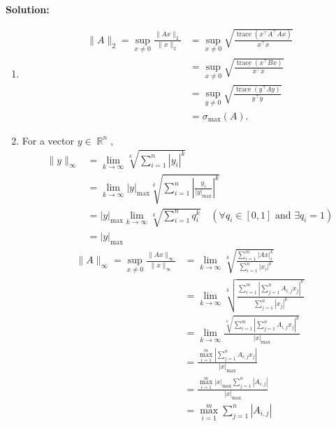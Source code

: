 \documentclass{article}
\DeclareMathOperator{\trac}{\mathrm{trace}}
\DeclareMathOperator{\R}{\mathbb{R}}
\newenvironment{solution}{\color{blue} \smallskip \textbf{Solution:}}{}
\begin{document}
\begin{enumerate}
    \begin{solution}
        \begin{enumerate}
            \item 
            \begin{align*}
            \|A\|_{2}=\sup_{x \neq 0} \frac{\|Ax\|_2}{\|x\|_2} &=
            \sup_{x \neq 0} \sqrt{\frac{\trac(x^\top A^\top A x)}{x^\top x}} \\
            &= \sup_{x \neq 0} \sqrt{\frac{\trac(x^\top B x)}{x^\top x}} \\
            &= \sup_{y \neq 0} \sqrt{\frac{\trac(y^\top \Lambda y)}{y^\top y}} \\
            &= \sigma_{\max}(A).
            \end{align*}
            \item
            For a vector $y \in \R^n$, 
            \begin{align*}
                \|y\|_\infty &= \lim_{k \to \infty} \sqrt[k]{\sum_{i=1}^n |y_i|^k} \\
                &= \lim_{k \to \infty} |y|_{\max} \sqrt[k]{\sum_{i=1}^n |\frac{y_i}{|y|_{\max}}|^k} \\
                &= |y|_{\max} \lim_{k \to \infty} \sqrt[k]{\sum_{i=1}^n q_i^k} \quad (\forall q_i \in [0, 1] \text{ and } \exists q_i=1) \\
                &= |y|_{\max}
            \end{align*}
            \begin{align*}
            \|A\|_{\infty} = \sup_{x \neq 0} \frac{\|Ax\|_\infty}{\|x\|_\infty} &=
            \lim_{k \to \infty} \sqrt[k]{\frac{\sum_{i=1}^m|Ax|_i^k}{\sum_{i=1}^n |x_i|^k}} \\
            &= \lim_{k \to \infty} \sqrt[k]{\frac{\sum_{i=1}^m|\sum_{j=1}^n A_{i,j}x_j|^k}{\sum_{j=1}^n |x_j|^k}} \\
            &= \lim_{k \to \infty} \frac{\sqrt[k]{\sum_{i=1}^m|\sum_{j=1}^n A_{i,j}x_j|^k}}{|x|_{\max}} \\
            &= \frac{\max_{i=1}^m|\sum_{j=1}^n A_{i,j}x_j|}{|x|_{\max}} \\
            &= \frac{\max_{i=1}^m |x|_{\max}\sum_{j=1}^n |A_{i,j}|}{|x|_{\max}} \\
            &= \max_{i=1}^m\sum_{j=1}^n |A_{i,j}|
            \end{align*}
        \end{enumerate}
    \end{solution}


\end{enumerate}
\end{document}
